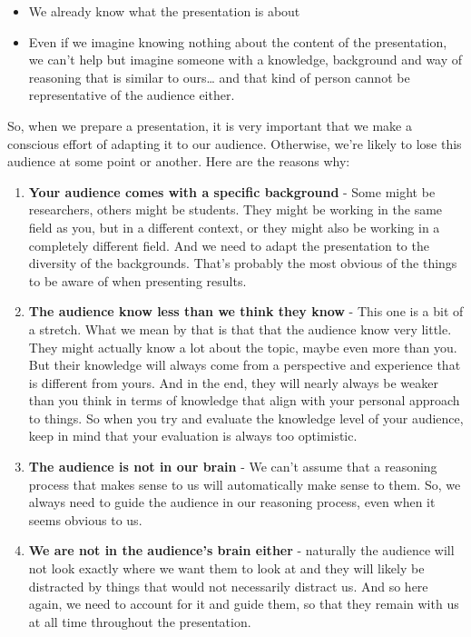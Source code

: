 \documentclass[
  titlepage]{book}
\providecommand{\tightlist}{%
  \setlength{\itemsep}{0pt}\setlength{\parskip}{0pt}}
\begin{document}
\begin{itemize}
\tightlist
\item
  We already know what the presentation is about
\item
  Even if we imagine knowing nothing about the content of the presentation, we can't help but imagine someone with a knowledge, background and way of reasoning that is similar to ours\ldots{} and that kind of person cannot be representative of the audience either.
\end{itemize}

So, when we prepare a presentation, it is very important that we make a conscious effort of adapting it to our audience. Otherwise, we're likely to lose this audience at some point or another. Here are the reasons why:

\begin{enumerate}
\def\labelenumi{\arabic{enumi}.}
\item
  \textbf{Your audience comes with a specific background} - Some might be researchers, others might be students. They might be working in the same field as you, but in a different context, or they might also be working in a completely different field. And we need to adapt the presentation to the diversity of the backgrounds. That's probably the most obvious of the things to be aware of when presenting results.
\item
  \textbf{The audience know less than we think they know} - This one is a bit of a stretch. What we mean by that is that that the audience know very little. They might actually know a lot about the topic, maybe even more than you. But their knowledge will always come from a perspective and experience that is different from yours. And in the end, they will nearly always be weaker than you think in terms of knowledge that align with your personal approach to things. So when you try and evaluate the knowledge level of your audience, keep in mind that your evaluation is always too optimistic.
\item
  \textbf{The audience is not in our brain} - We can't assume that a reasoning process that makes sense to us will automatically make sense to them. So, we always need to guide the audience in our reasoning process, even when it seems obvious to us.
\item
  \textbf{We are not in the audience's brain either} - naturally the audience will not look exactly where we want them to look at and they will likely be distracted by things that would not necessarily distract us. And so here again, we need to account for it and guide them, so that they remain with us at all time throughout the presentation.
\end{enumerate}
\end{document}
